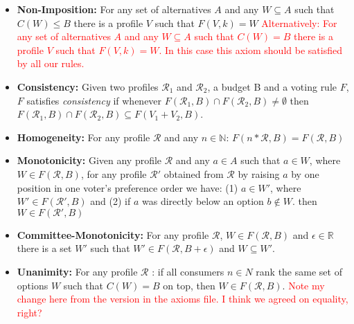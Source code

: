 \documentclass{article}
\begin{document}
\begin{itemize}
	\item \textbf{Non-Imposition:} For any set of alternatives $A$ and any  $W\subseteq A$ such that $C(W) \leq B$ there is a profile $V$ such that $F(V, k)=W$ \textcolor{red}{Alternatively: For any set of alternatives $A$ and any  $W\subseteq A$ such that $C(W) = B$ there is a profile $V$ such that $F(V, k)=W$. In this case this axiom should be satisfied by all our rules.}
	\item \textbf{Consistency:} Given two profiles $\mathcal{R}_1$ and $\mathcal{R}_2$, a budget B and a voting rule $F$, $F$ satisfies \emph{consistency} if whenever $F(\mathcal{R}_1, B)\cap F(\mathcal{R}_2, B )\neq \emptyset$ then $F(\mathcal{R}_1, B)\cap F(\mathcal{R}_2, B)\subseteq F(V_1+V_2, B)$.
	\item \textbf{Homogeneity:} For any profile $\mathcal{R}$ and any $n \in \mathbb{N}$: $F(n*\mathcal{R}, B)=F(\mathcal{R}, B)$
	\item \textbf{Monotonicity:} Given any profile $\mathcal{R}$ and any $a \in A$ such that $a \in W$, where $W \in F(\mathcal{R}, B)$, for any profile $\mathcal{R'}$ obtained from $\mathcal{R}$ by raising $a$ by one position in one voter's preference order we have: (1) $a \in W'$, where $W' \in F(\mathcal{R'}, B)$ and (2) if $a$ was directly below an option $b \notin W$. then $W \in F(\mathcal{R'}, B)$

	\item \textbf{Committee-Monotonicity:} For any profile $\mathcal{R}$, $W \in F(\mathcal{R}, B)$ and $\epsilon\in\mathbb{R}$ there is a set $W'$ such that $W' \in F(\mathcal{R}, B + \epsilon)$ and $W \subseteq W'$.

	\item \textbf{Unanimity:} For any profile $\mathcal{R}$ : if all consumers $n \in N$ rank the same set of options $W$ such that $C(W) = B$ on top, then $W \in F(\mathcal{R}, B)$. \textcolor{red}{Note my change here from the version in the axioms file. I think we agreed on equality, right?}

\end{itemize}
\end{document}
